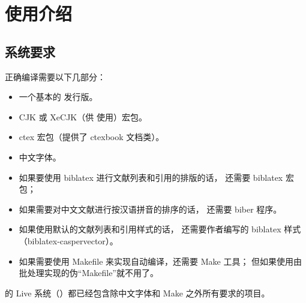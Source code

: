 %
%
%
%
%

\chapter{使用介绍}
	\section{系统要求}\label{sec:req}

	正确编译需要以下几部分：
	\begin{itemize}
		\item 一个基本的  发行版。
		\item CJK 或 XeCJK（供  使用）宏包。
		\item ctex 宏包\supercite{ctex,ctex-faq}（提供了 ctexbook 文档类）。
		\item 中文字体。
		\item 如果要使用 biblatex 进行文献列表和引用的排版的话，
			还需要 biblatex 宏包\supercite{biblatex}；
		\item 如果需要对中文文献进行按汉语拼音的排序的话，
			还需要 biber 程序\supercite{biber}。
		\item 如果使用默认的文献列表和引用样式的话，
			还需要作者编写的 biblatex 样式
			（biblatex-caspervector）\supercite{biblatex-caspervector}。
		\item 如果需要使用 Makefile 来实现自动编译，还需要 Make 工具；
			但如果使用由批处理实现的伪“Makefile”就不用了。
	\end{itemize}

	的  Live 系统（）都已经包含除中文字体和 Make 之外所有要求的项目。%

